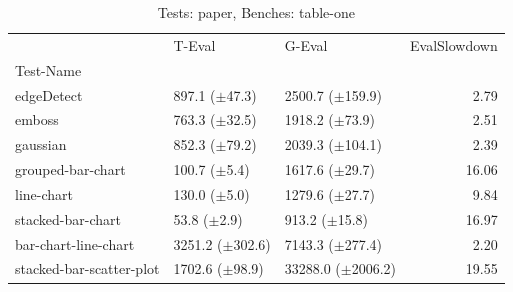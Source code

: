 \begin{table}
\caption{Tests: paper, Benches: table-one}
\label{paper-table-one}
\begin{tabular}{lllr}
\toprule
 & T-Eval & G-Eval & EvalSlowdown \\
Test-Name &  &  &  \\
\midrule
edgeDetect & 897.1 ($\pm$47.3) & 2500.7 ($\pm$159.9) & 2.79 \\
emboss & 763.3 ($\pm$32.5) & 1918.2 ($\pm$73.9) & 2.51 \\
gaussian & 852.3 ($\pm$79.2) & 2039.3 ($\pm$104.1) & 2.39 \\
grouped-bar-chart & 100.7 ($\pm$5.4) & 1617.6 ($\pm$29.7) & 16.06 \\
line-chart & 130.0 ($\pm$5.0) & 1279.6 ($\pm$27.7) & 9.84 \\
stacked-bar-chart & 53.8 ($\pm$2.9) & 913.2 ($\pm$15.8) & 16.97 \\
bar-chart-line-chart & 3251.2 ($\pm$302.6) & 7143.3 ($\pm$277.4) & 2.20 \\
stacked-bar-scatter-plot & 1702.6 ($\pm$98.9) & 33288.0 ($\pm$2006.2) & 19.55 \\
\bottomrule
\end{tabular}
\end{table}

